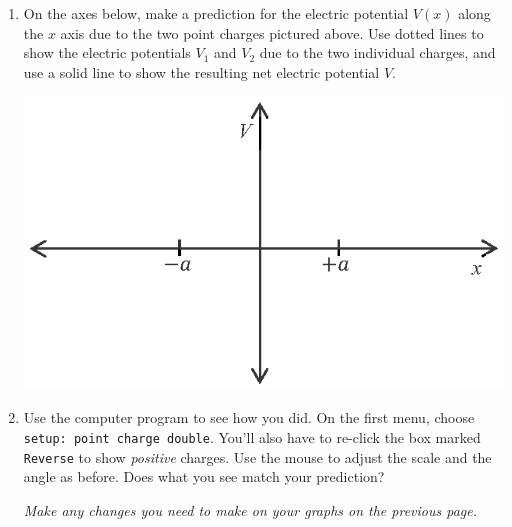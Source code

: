 \begin{enumerate}[labparts]

\item On the axes below, make a prediction for the electric potential $V(x)$ along the $x$ axis due to the two point charges pictured above.  Use dotted lines to show the electric potentials $V_1$ and $V_2$ due to the two individual charges, and use a solid line to show the resulting net electric potential $V$.  
\begin{center}
\includegraphics{potential_superposition/activity_2_3_figs/V_axes.eps}
\end{center}

\item Use the computer program to see how you did.  On the first menu, choose \verb!setup: point charge double!.  You'll also have to re-click the box marked \verb!Reverse! to show \textit{positive} charges.  Use the mouse to adjust the scale and the angle as before.  Does what you see match your prediction?
\answerspace{0.3in}

\textit{Make any changes you need to make on your graphs on the previous page.}


\end{enumerate}
